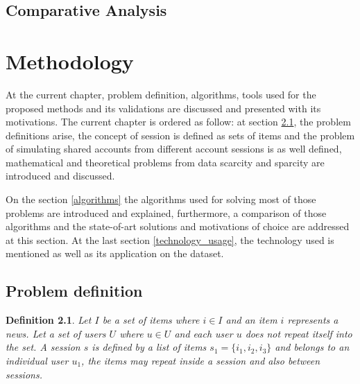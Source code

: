 \documentclass[ecp,tc,english]{iiufrgs}
\newtheorem{definition}{Definition}
\begin{document}
\section{Comparative Analysis}
    



\chapter{Methodology} \label{methodology}
At the current chapter, problem definition, algorithms, tools used for the proposed methods and its validations are discussed and presented with its motivations. The current chapter is ordered as follow: at section \ref{problem_definition}, the problem definitions arise, the concept of session is defined as sets of items and the problem of simulating shared accounts from different account sessions is as well defined, mathematical and theoretical problems from data scarcity and sparcity are introduced and discussed.

On the section \ref{algorithms} the algorithms used for solving most of those problems are introduced and explained, furthermore, a comparison of those algorithms and the state-of-art solutions and motivations of choice are addressed at this section. At the last section \ref{technology_usage}, the technology used is mentioned as well as its application on the dataset.

    \section{Problem definition} \label{problem_definition}
    \begin{definition}
    Let \(I \) be a set of items where \(i \in I \) and an item \(i\) represents a news. Let a set of users \(U\) where \(u \in U \) and each user \(u\) does not repeat itself into the set.
    A session \(s\) is defined by a list of items \(s_{1} = \{i_{1}, i_{2}, i_{3}\}\) and belongs to an individual user \(u_{1}\), the items may repeat inside a session and also between sessions.
    \end{definition}
    
\end{document}

